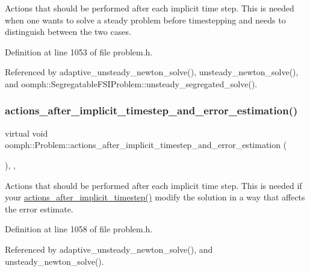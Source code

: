 Actions that should be performed after each implicit time step. This is needed when one wants to solve a steady problem before timestepping and needs to distinguish between the two cases. 



Definition at line 1053 of file problem.\+h.



Referenced by adaptive\+\_\+unsteady\+\_\+newton\+\_\+solve(), unsteady\+\_\+newton\+\_\+solve(), and oomph\+::\+Segregatable\+F\+S\+I\+Problem\+::unsteady\+\_\+segregated\+\_\+solve().

\mbox{\label{classoomph_1_1Problem_a38d914a74e7998ddc74c205884d36d57}} 
\subsubsection{\texorpdfstring{actions\+\_\+after\+\_\+implicit\+\_\+timestep\+\_\+and\+\_\+error\+\_\+estimation()}{actions\_after\_implicit\_timestep\_and\_error\_estimation()}}
{\footnotesize\ttfamily virtual void oomph\+::\+Problem\+::actions\+\_\+after\+\_\+implicit\+\_\+timestep\+\_\+and\+\_\+error\+\_\+estimation (\begin{DoxyParamCaption}{ }\end{DoxyParamCaption})\hspace{0.3cm}{\ttfamily [inline]}, {\ttfamily [protected]}, {\ttfamily [virtual]}}



Actions that should be performed after each implicit time step. This is needed if your \hyperlink{classoomph_1_1Problem_a012692496c968960f4ea27db4e89cc7d}{actions\+\_\+after\+\_\+implicit\+\_\+timestep()} modify the solution in a way that affects the error estimate. 



Definition at line 1058 of file problem.\+h.



Referenced by adaptive\+\_\+unsteady\+\_\+newton\+\_\+solve(), and unsteady\+\_\+newton\+\_\+solve().

